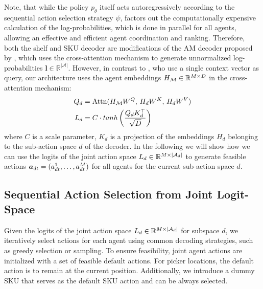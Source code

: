 Note, that while the policy $p_\theta$ itself acts autoregressively according to the sequential action selection strategy $\psi$,  factors out the computationally expensive calculation of the log-probabilities, which is done in parallel for all agents, allowing an effective and efficient agent coordination and ranking. Therefore, both the shelf and SKU decoder are modifications of the AM decoder proposed by \cite{kool2018attention}, which uses the cross-attention mechanism to generate unnormalized log-probabilities $\bm{l} \in \mathbb{R^{|\mathcal{A}|}}$. However, in contrast to \cite{kool2018attention}, who use a single context vector as query, our architecture uses the agent embeddings $H_{\mathcal{M}} \in \mathbb{R}^{{M} \times D}$ in the cross-attention mechanism: 
%
\begin{align}
    \label{eq:attn_dec}
    Q_d &= \text{Attn}(H_{\mathcal{M}} W^Q, \, H_d W^K, \, H_d W^V) \\
    L_d &= C \cdot tanh \left ( \frac{Q_d K_d^\top}{\sqrt{{D}}}  \right )
\end{align}
%
where $C$ is a scale parameter, $K_d$ is a projection of the embeddings $H_d$ belonging to the sub-action space $d$ of the decoder. In the following we will show how we can use the logits of the joint action space $L_d \in \mathbb{R}^{{M} \times |\mathcal{A}_d|}$ to generate feasible actions $\bm{a}_{dt}=(a^{1}_{dt},\ldots,a^{{M}}_{dt})$ for all agents for the current sub-action space $d$.


\subsection{Sequential Action Selection from Joint Logit-Space}
\label{sec:seq_action_selection}


Given the logits of the joint action space $L_d \in \mathbb{R}^{{M} \times |\mathcal{A}_d|}$ for subspace $d$, we iteratively select actions for each agent using common decoding strategies, such as greedy selection or sampling.
To ensure feasibility, joint agent actions are initialized with a set of feasible default actions. For picker locations, the default action is to remain at the current position. Additionally, we introduce a dummy SKU that serves as the default SKU action and can be always selected. 

